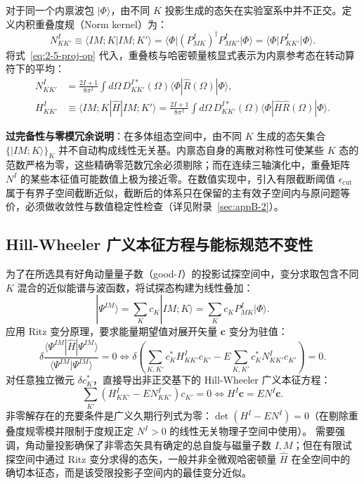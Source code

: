 对于同一个内禀波包 $|\Phi\rangle$，由不同 $K$ 投影生成的态矢在实验室系中并不正交。定义内积重叠度规（Norm kernel）为：
\begin{equation}\label{eq:2-5-norm-kernel}
N^I_{KK'} \equiv \langle IM; K | IM; K' \rangle = \langle \Phi | (P^I_{MK})^\dagger P^I_{MK'} | \Phi \rangle = \langle \Phi | P^I_{KK'} | \Phi \rangle.
\end{equation}
将式~\eqref{eq:2-5-proj-op} 代入，重叠核与哈密顿量核显式表示为内禀参考态在转动算符下的平均：
\begin{align}
N^I_{KK'} &= \frac{2I+1}{8\pi^2} \int d\Omega \, D^{I*}_{KK'}(\Omega) \langle \Phi | \hat{R}(\Omega) | \Phi \rangle, \label{eq:2-5-norm-integral} \\
H^I_{KK'} &\equiv \langle IM; K | \hat{H} | IM; K' \rangle = \frac{2I+1}{8\pi^2} \int d\Omega \, D^{I*}_{KK'}(\Omega) \langle \Phi | \hat{H} \hat{R}(\Omega) | \Phi \rangle. \label{eq:2-5-hamiltonian-kernel}
\end{align}

\textbf{过完备性与零模冗余说明}：在多体组态空间中，由不同 $K$ 生成的态矢集合 $\{ |IM; K\rangle \}_K$ 并不自动构成线性无关基。内禀态自身的离散对称性可使某些 $K$ 态的范数严格为零，这些精确零范数冗余必须剔除；而在连续三轴演化中，重叠矩阵 $N^I$ 的某些本征值可能数值上极为接近零。在数值实现中，引入有限截断阈值 $\epsilon_{\text{cut}}$ 属于有界子空间截断近似，截断后的体系只在保留的主有效子空间内与原问题等价，必须做收敛性与数值稳定性检查（详见附录~\ref{sec:appB-2}）。

\subsection{Hill-Wheeler 广义本征方程与能标规范不变性}\label{sec:2-5-3}

为了在所选具有好角动量量子数（good-$I$）的投影试探空间中，变分求取包含不同 $K$ 混合的近似能谱与波函数，将试探态构建为线性叠加：
\begin{equation}\label{eq:2-5-trial-state}
|\Psi^{IM}\rangle = \sum_K c_K |IM; K\rangle = \sum_K c_K P^I_{MK} |\Phi\rangle.
\end{equation}
应用 Ritz 变分原理，要求能量期望值对展开矢量 $\mathbf{c}$ 变分为驻值：
\begin{equation}\label{eq:2-5-variation}
\delta \frac{\langle \Psi^{IM} | \hat{H} | \Psi^{IM} \rangle}{\langle \Psi^{IM} | \Psi^{IM} \rangle} = 0 \iff \delta \left( \sum_{K, K'} c_K^* H^I_{KK'} c_{K'} - E \sum_{K, K'} c_K^* N^I_{KK'} c_{K'} \right) = 0.
\end{equation}
对任意独立微元 $\delta c_K^*$，直接导出非正交基下的 Hill-Wheeler 广义本征方程：
\begin{equation}\label{eq:2-5-hill-wheeler}
\sum_{K'} \left( H^I_{KK'} - E N^I_{KK'} \right) c_{K'} = 0 \iff H^I \mathbf{c} = E N^I \mathbf{c}.
\end{equation}
非零解存在的充要条件是广义久期行列式为零：$\det(H^I - E N^I) = 0$（在剔除重叠度规零模并限制于度规正定 $N^I > 0$ 的线性无关物理子空间中使用）。
需要强调，角动量投影确保了非零态矢具有确定的总自旋与磁量子数 $I, M$；但在有限试探空间中通过 Ritz 变分求得的态矢，一般并非全微观哈密顿量 $\hat{H}$ 在全空间中的确切本征态，而是该受限投影子空间内的最佳变分近似。

